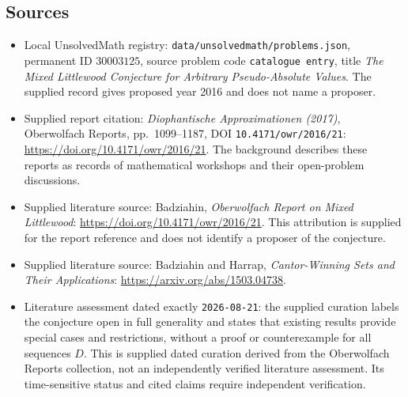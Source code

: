 \documentclass[11pt]{article}
\begin{document}
\subsection{Sources}
\begin{itemize}
\item Local UnsolvedMath registry: \texttt{data/unsolvedmath/problems.json}, permanent ID \(30003125\), source problem code \texttt{catalogue entry}, title \emph{The Mixed Littlewood Conjecture for Arbitrary Pseudo-Absolute Values}. The supplied record gives proposed year 2016 and does not name a proposer.
\item Supplied report citation: \emph{Diophantische Approximationen (2017)}, Oberwolfach Reports, pp.\ 1099--1187, DOI \texttt{10.4171/owr/2016/21}: \url{https://doi.org/10.4171/owr/2016/21}. The background describes these reports as records of mathematical workshops and their open-problem discussions.
\item Supplied literature source: Badziahin, \emph{Oberwolfach Report on Mixed Littlewood}: \url{https://doi.org/10.4171/owr/2016/21}. This attribution is supplied for the report reference and does not identify a proposer of the conjecture.
\item Supplied literature source: Badziahin and Harrap, \emph{Cantor-Winning Sets and Their Applications}: \url{https://arxiv.org/abs/1503.04738}.
\item Literature assessment dated exactly \texttt{2026-08-21}: the supplied curation labels the conjecture open in full generality and states that existing results provide special cases and restrictions, without a proof or counterexample for all sequences \(D\). This is supplied dated curation derived from the Oberwolfach Reports collection, not an independently verified literature assessment. Its time-sensitive status and cited claims require independent verification.
\end{itemize}
\end{document}
